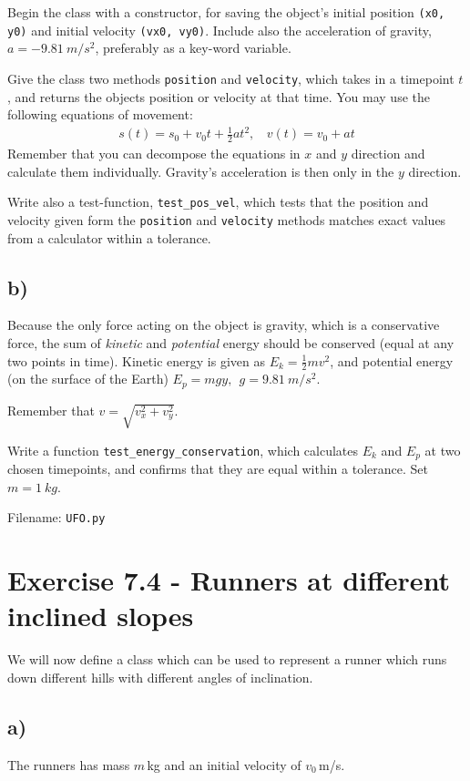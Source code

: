 \documentclass[10pt,a4paper]{article}
\newcommand{\half}{\frac{1}{2}}
\begin{document}
Begin the class with a constructor, for saving the object's initial position \texttt{(x0, y0)} and initial velocity \texttt{(vx0, vy0)}. Include also the acceleration of gravity, $a = \SI{-9.81}{m/s^2}$, preferably as a key-word variable.

Give the class two methods \texttt{position} and \texttt{velocity}, which takes in a timepoint $t$, and returns the objects position or velocity at that time. You may use the following equations of movement:
\begin{align*}
s(t) = s_0 + v_0t + \half at^2, \ \ \ \ v(t) = v_0 + at
\end{align*}
Remember that you can decompose the equations in $x$ and $y$ direction and calculate them individually. Gravity's acceleration is then only in the $y$ direction.

Write also a test-function, \texttt{test\_pos\_vel}, which tests that the position and velocity given form the \texttt{position} and \texttt{velocity} methods matches exact values from a calculator within a tolerance.


\subsection*{b)}
Because the only force acting on the object is gravity, which is a conservative force, the sum of \textit{kinetic} and \textit{potential} energy should be conserved (equal at any two points in time). Kinetic energy is given as $E_k = \half m v^2$, and potential energy (on the surface of the Earth) $E_p = mgy, \ \ g=\SI{9.81}{m/s^2}$.

Remember that $v = \sqrt{v_x^2 + v_y^2}$.

Write a function \texttt{test\_energy\_conservation}, which calculates $E_k$ and $E_p$ at two chosen timepoints, and confirms that they are equal within a tolerance. Set $m=\SI{1}{kg}$.

Filename: \texttt{UFO.py}



\section*{Exercise 7.4 - Runners at different inclined slopes}
We will now define a class which can be used to represent a runner which runs down different hills with different angles of inclination.

\subsection*{a)}
The runners has mass $m\,$kg and an initial velocity of $v_0\,$m/s. 
\end{document}
